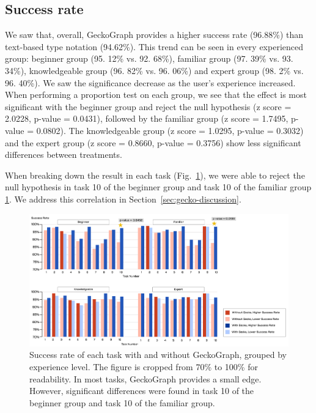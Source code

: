 \subsection{Success rate}
We saw that, overall, GeckoGraph provides a higher success rate (96.88\%) than text-based type notation (94.62\%). This trend can be seen in every experienced group: beginner group (95. 12\% vs. 92. 68\%), familiar group (97. 39\% vs. 93. 34\%), knowledgeable group (96. 82\% vs. 96. 06\%) and expert group (98. 2\% vs. 96. 40\%). We saw the significance decrease as the user's experience increased. When performing a proportion test on each group, we see that the effect is most significant with the beginner group and reject the null hypothesis (z score = 2.0228, p-value = 0.0431), followed by the familiar group (z score = 1.7495, p-value = 0.0802). The knowledgeable group (z score = 1.0295, p-value = 0.3032) and the expert group (z score = 0.8660, p-value = 0.3756) show less significant differences between treatments. 

When breaking down the result in each task (Fig.~\ref{fig:success-rate}), we were able to reject the null hypothesis in task 10 of the beginner group and task 10 of the familiar group \ref{fig:success-rate}. We address this correlation in Section~\ref{sec:gecko-discussion}.


\begin{figure}[hbt]
  \includegraphics[width=\linewidth]{figures/SuccessfulRate}
  \caption[Success rate of each task with and without GeckoGraph, grouped by experience level]{\label{fig:success-rate}Success rate of each task with and without GeckoGraph, grouped by experience level. The figure is cropped from 70\% to 100\% for readability. In most tasks, GeckoGraph provides a small edge. However, significant differences were found in task 10 of the beginner group and task 10 of the familiar group. }
\end{figure}

